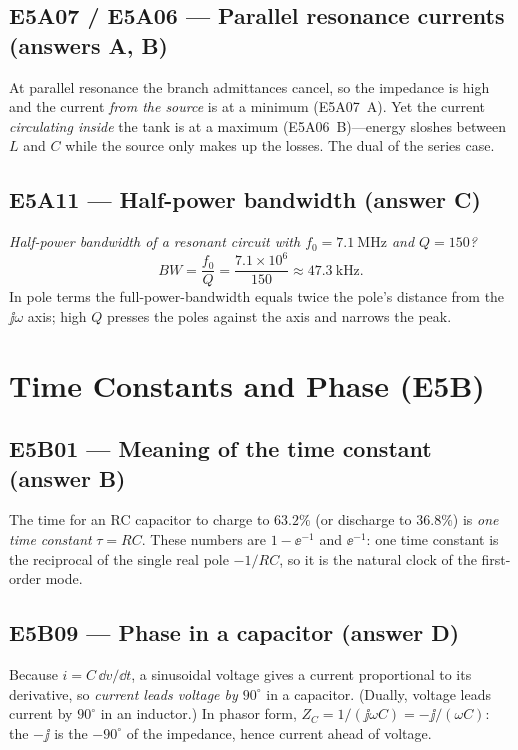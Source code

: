 \subsection*{E5A07 / E5A06 --- Parallel resonance currents (answers A, B)}
At parallel resonance the branch admittances cancel, so the impedance is high and
the current \emph{from the source} is at a minimum (E5A07~A). Yet the current
\emph{circulating inside} the tank is at a maximum (E5A06~B)---energy sloshes
between \(L\) and \(C\) while the source only makes up the losses. The dual of the
series case.

\subsection*{E5A11 --- Half-power bandwidth (answer C)}
\emph{Half-power bandwidth of a resonant circuit with \(f_0=\SI{7.1}{\mega\hertz}\)
and \(Q=150\)?}
\[
BW=\frac{f_0}{Q}=\frac{7.1\times10^6}{150}\approx\SI{47.3}{\kilo\hertz}.
\]
In pole terms the full-power-bandwidth equals twice the pole's distance from the
\(\jj\omega\) axis; high \(Q\) presses the poles against the axis and narrows the
peak.

\section{Time Constants and Phase (E5B)}

\subsection*{E5B01 --- Meaning of the time constant (answer B)}
The time for an RC capacitor to charge to \(63.2\%\) (or discharge to \(36.8\%\))
is \emph{one time constant} \(\tau=RC\). These numbers are \(1-\ee^{-1}\) and
\(\ee^{-1}\): one time constant is the reciprocal of the single real pole
\(-1/RC\), so it is the natural clock of the first-order mode.

\subsection*{E5B09 --- Phase in a capacitor (answer D)}
Because \(i=C\,\dd v/\dd t\), a sinusoidal voltage gives a current proportional to
its derivative, so \emph{current leads voltage by \(90^\circ\)} in a capacitor.
(Dually, voltage leads current by \(90^\circ\) in an inductor.) In phasor form,
\(Z_C=1/(\jj\omega C)=-\jj/(\omega C)\): the \(-\jj\) is the \(-90^\circ\) of the
impedance, hence current ahead of voltage.

